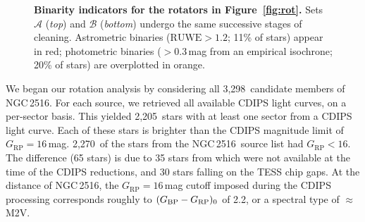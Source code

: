 \documentclass[12pt,twocolumn,tighten]{aastex63}
\newcommand{\cn}{NGC\,2516} %
\newcommand{\nkinematic}{3{,}298} %
\newcommand{\ncdips}{2{,}205}
\newcommand{\nkinematicrpltsixteen}{2{,}270}
\newcommand{\bpmrpo}{(G_{\rm BP}-G_{\rm RP})_0}
\begin{document}
\begin{figure}[t]
	\begin{center}
		\leavevmode

    \vspace{-0.5cm}
	\end{center}
	\vspace{-0.7cm}
  \caption{ {\bf Binarity indicators for the rotators in
  Figure~\ref{fig:rot}.} Sets $\mathcal{A}$ ({\it top}) and
  $\mathcal{B}$ ({\it bottom}) undergo the same successive stages of
  cleaning.  Astrometric binaries ($\mathrm{RUWE}>1.2$; 11\% of stars)
  appear in red; photometric binaries ($>$0.3\,mag from an empirical
  isochrone; 20\% of stars) are overplotted in orange.  
  \label{fig:binarity}
	}
\end{figure}


We began our rotation analysis by considering all \nkinematic\
candidate members of \cn.  For each source, we retrieved all available
CDIPS light curves, on a per-sector basis.  This yielded \ncdips\
stars with at least one sector from a CDIPS light curve.  Each of
these stars is brighter than the CDIPS magnitude limit of
$G_\mathrm{RP}=16$\,mag.  \nkinematicrpltsixteen\ of the stars from the \cn\
source list had $G_\mathrm{RP}<16$.  The difference (65 stars) is due to 35 stars
from \citet{meingast_2021} which were not available at the time of the
CDIPS reductions, and 30 stars falling on the TESS chip gaps.  At the
distance of \cn, the $G_\mathrm{RP}=16$\,mag cutoff imposed during the CDIPS
processing corresponds roughly to $\bpmrpo$ of 2.2, or a spectral type
of $\approx$M2V.
\end{document}
